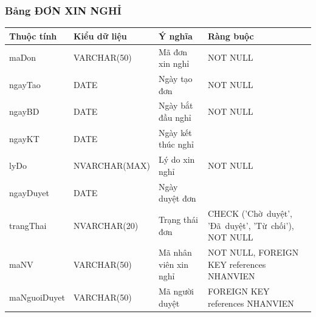 \documentclass[a4paper,12pt]{report}
\begin{document}
\subsubsection{Bảng ĐƠN XIN NGHỈ}
\noindent
\begin{center}
    \begin{longtable}{|>{\centering\arraybackslash}p{3cm}|
        >{\centering\arraybackslash}p{4.4cm}|
        >{\centering\arraybackslash}p{4cm}|
        >{\centering\arraybackslash}p{3.6cm}|}
        \hline
        \textbf{Thuộc tính}                                                                                                               &
        \textbf{Kiểu dữ liệu}                                                                                                                             &
        \textbf{Ý nghĩa}                                                                                                 &
        \textbf{Ràng buộc}                                                                                                         \\
        \hline
        maDon &  VARCHAR(50)  & Mã đơn xin nghỉ & NOT NULL \\
        \hline
        ngayTao &  DATE  & Ngày tạo đơn & NOT NULL \\                                                                                                                          
        \hline
        ngayBD &  DATE  & Ngày bắt đầu nghỉ & NOT NULL \\                                                                                                                          
        \hline
        ngayKT &  DATE  & Ngày kết thúc nghỉ & \\                                                                                                                          
        \hline
        lyDo &  NVARCHAR(MAX)  & Lý do xin nghỉ & NOT NULL \\                                                                                                                          
        \hline
        ngayDuyet &  DATE  & Ngày duyệt đơn & \\                                                                                                                          
        \hline
        trangThai &  NVARCHAR(20)  & Trạng thái đơn & CHECK ('Chờ~duyệt', 'Đã~duyệt', 'Từ~chối'), NOT NULL \\
        \hline
        maNV &  VARCHAR(50)  & Mã nhân viên xin nghỉ & NOT NULL, FOREIGN KEY references NHANVIEN \\                                                                                                                          
        \hline
        maNguoiDuyet &  VARCHAR(50)  & Mã người duyệt & FOREIGN KEY references NHANVIEN \\                                                                                                                          
        \hline
    \end{longtable}
\end{center}
\end{document}

